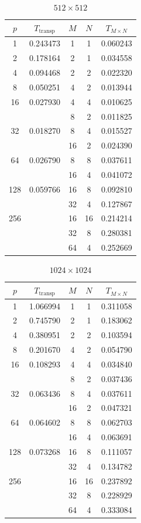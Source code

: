 \documentclass[a4paper,11pt]{article}
\begin{document}
\begin{minipage}{6.5cm}
\begin{table}[H]
\begin{tabular}{|cc|ccc|}
\hline
$p$ & $T_\text{transp}$ & $M$ & $N$ & $ T_{M \times N}$ \\ \hline
1 & 0.243473 & 1 & 1 & 0.060243 \\ \hline
2 & 0.178164 & 2 & 1 & 0.034558 \\ \hline
4 & 0.094468 & 2 & 2 & 0.022320 \\ \hline
8 & 0.050251 & 4 & 2 & 0.013944 \\ \hline
16 & 0.027930 & 4 & 4 & 0.010625 \\
 & & 8 & 2 & 0.011825 \\ \hline
32 & 0.018270 & 8 & 4 & 0.015527 \\
& & 16 & 2 & 0.024390 \\ \hline
64 & 0.026790 & 8 & 8 & 0.037611 \\
& & 16 & 4 & 0.041072 \\ \hline
128 & 0.059766 & 16 & 8 & 0.092810 \\
& & 32 & 4 & 0.127867 \\ \hline
256 & & 16 & 16 & 0.214214 \\
& & 32 & 8 & 0.280381 \\
& & 64 & 4 & 0.252669 \\ \hline
\end{tabular}
\caption{$512 \times 512$}\label{tab:512}
\end{table}
\end{minipage}
\begin{minipage}{6.5cm}
\begin{table}[H]
\begin{tabular}{|cc|ccc|}
\hline
$p$ & $T_\text{transp}$ & $M$ & $N$ & $ T_{M \times N}$ \\ \hline
1 & 1.066994 & 1 & 1 & 0.311058 \\ \hline
2 & 0.745790 & 2 & 1 & 0.183062 \\ \hline
4 & 0.380951 & 2 & 2 & 0.103594 \\ \hline
8 & 0.201670 & 4 & 2 & 0.054790 \\ \hline
16 & 0.108293 & 4 & 4 & 0.034840 \\
 & & 8 & 2 & 0.037436 \\ \hline
32 & 0.063436 & 8 & 4 & 0.037611 \\
& & 16 & 2 & 0.047321 \\ \hline
64 & 0.064602 & 8 & 8 & 0.062703 \\
& & 16 & 4 & 0.063691 \\ \hline
128 & 0.073268 & 16 & 8 & 0.111057\\
& & 32 & 4 & 0.134782 \\ \hline
256 & & 16 & 16 & 0.237892 \\
& & 32 & 8 & 0.228929 \\
& & 64 & 4 & 0.333084 \\ \hline
\end{tabular}
\caption{$1024 \times 1024$} \label{tab:1024}
\end{table}
\end{minipage}
\end{document}
